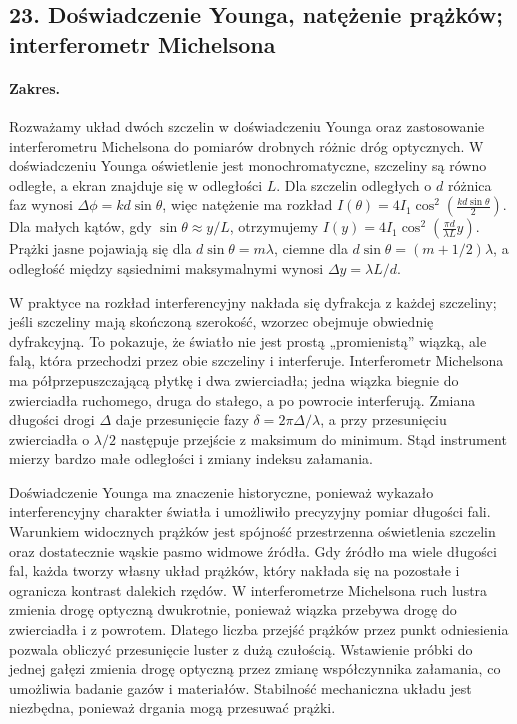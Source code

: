 \documentclass[11pt,a4paper]{article}
\begin{document}
\subsection{23. Doświadczenie Younga, natężenie prążków; interferometr Michelsona}
\paragraph{Zakres.} Rozważamy układ dwóch szczelin w doświadczeniu Younga oraz zastosowanie interferometru Michelsona do pomiarów drobnych różnic dróg optycznych. W doświadczeniu Younga oświetlenie jest monochromatyczne, szczeliny są równo odległe, a ekran znajduje się w odległości $L$. Dla szczelin odległych o $d$ różnica faz wynosi $\Delta\phi = k d\sin\theta$, więc natężenie ma rozkład $I(\theta)=4I_1\cos^2\left(\frac{kd\sin\theta}{2}\right)$. Dla małych kątów, gdy $\sin\theta\approx y/L$, otrzymujemy $I(y)=4I_1\cos^2\left(\frac{\pi d}{\lambda L}y\right)$. Prążki jasne pojawiają się dla $d\sin\theta=m\lambda$, ciemne dla $d\sin\theta=(m+1/2)\lambda$, a odległość między sąsiednimi maksymalnymi wynosi $\Delta y = \lambda L/d$.\par
W praktyce na rozkład interferencyjny nakłada się dyfrakcja z każdej szczeliny; jeśli szczeliny mają skończoną szerokość, wzorzec obejmuje obwiednię dyfrakcyjną. To pokazuje, że światło nie jest prostą „promienistą” wiązką, ale falą, która przechodzi przez obie szczeliny i interferuje. Interferometr Michelsona ma półprzepuszczającą płytkę i dwa zwierciadła; jedna wiązka biegnie do zwierciadła ruchomego, druga do stałego, a po powrocie interferują. Zmiana długości drogi $\Delta$ daje przesunięcie fazy $\delta = 2\pi\Delta/\lambda$, a przy przesunięciu zwierciadła o $\lambda/2$ następuje przejście z maksimum do minimum. Stąd instrument mierzy bardzo małe odległości i zmiany indeksu załamania.\par

Doświadczenie Younga ma znaczenie historyczne, ponieważ wykazało interferencyjny charakter światła i umożliwiło precyzyjny pomiar długości fali. Warunkiem widocznych prążków jest spójność przestrzenna oświetlenia szczelin oraz dostatecznie wąskie pasmo widmowe źródła. Gdy źródło ma wiele długości fal, każda tworzy własny układ prążków, który nakłada się na pozostałe i ogranicza kontrast dalekich rzędów. W interferometrze Michelsona ruch lustra zmienia drogę optyczną dwukrotnie, ponieważ wiązka przebywa drogę do zwierciadła i z powrotem. Dlatego liczba przejść prążków przez punkt odniesienia pozwala obliczyć przesunięcie luster z dużą czułością. Wstawienie próbki do jednej gałęzi zmienia drogę optyczną przez zmianę współczynnika załamania, co umożliwia badanie gazów i materiałów. Stabilność mechaniczna układu jest niezbędna, ponieważ drgania mogą przesuwać prążki.
\par
\end{document}
